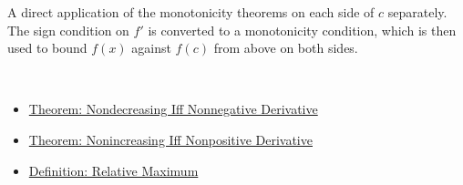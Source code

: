 \begin{remark*}
A direct application of the monotonicity theorems on each side of $c$ separately. The sign condition on $f'$ is converted to a monotonicity condition, which is then used to bound $f(x)$ against $f(c)$ from above on both sides.
\end{remark*}

\begin{remark*}[Dependencies]~\\
\begin{itemize}
  \item \hyperref[thm:nondecreasing-iff-nonneg-derivative]{Theorem: Nondecreasing Iff Nonneg\-ative Derivative}
  \item \hyperref[thm:nonincreasing-iff-nonpos-derivative]{Theorem: Nonincreasing Iff Nonpos\-itive Derivative}
  \item \hyperref[def:relative-maximum]{Definition: Relative Maximum}
\end{itemize}
\end{remark*}

\clearpage
